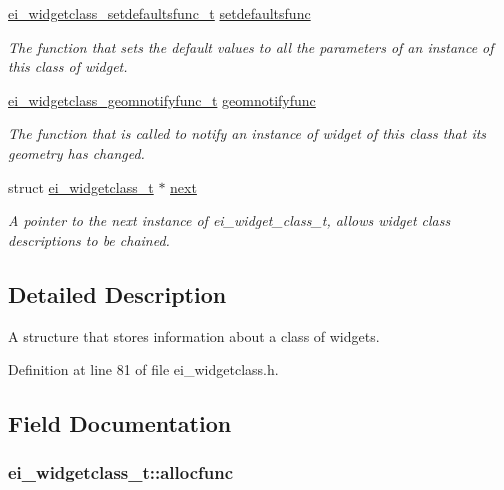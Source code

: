 \begin{DoxyCompactItemize}
\hyperlink{ei__widgetclass_8h_aa04d729c9dca14d3ac92c0f9aa8cc5cb}{ei\_\-widgetclass\_\-setdefaultsfunc\_\-t} \hyperlink{structei__widgetclass__t_a5fec706eefca10172d897cf61b268510}{setdefaultsfunc}
\begin{DoxyCompactList}\small\item\em The function that sets the default values to all the parameters of an instance of this class of widget. \item\end{DoxyCompactList}\item 
\hyperlink{ei__widgetclass_8h_a751dc2e4c264c3597fcc2d59878f6265}{ei\_\-widgetclass\_\-geomnotifyfunc\_\-t} \hyperlink{structei__widgetclass__t_aaf0aa3f54a48a6b3f8b8e12574ede4b7}{geomnotifyfunc}
\begin{DoxyCompactList}\small\item\em The function that is called to notify an instance of widget of this class that its geometry has changed. \item\end{DoxyCompactList}\item 
struct \hyperlink{structei__widgetclass__t}{ei\_\-widgetclass\_\-t} $\ast$ \hyperlink{structei__widgetclass__t_aa184e650475ec2451f033858db1876f0}{next}
\begin{DoxyCompactList}\small\item\em A pointer to the next instance of ei\_\-widget\_\-class\_\-t, allows widget class descriptions to be chained. \item\end{DoxyCompactList}\end{DoxyCompactItemize}


\subsection{Detailed Description}
A structure that stores information about a class of widgets. 

Definition at line 81 of file ei\_\-widgetclass.h.

\subsection{Field Documentation}
\hypertarget{structei__widgetclass__t_a233446250cdde4347c1381427923d21a}{
\subsubsection[{allocfunc}]{ {\bf ei\_\-widgetclass\_\-t::allocfunc}}}
\label{structei__widgetclass__t_a233446250cdde4347c1381427923d21a}


